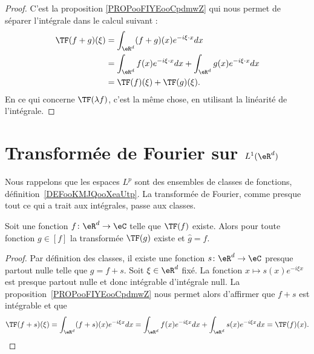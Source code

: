 \begin{proof}
	C'est la proposition \ref{PROPooFIYEooCpdmwZ} qui nous permet de séparer l'intégrale dans le calcul suivant :
	\begin{subequations}
		\begin{align}
			\TF(f+g)(\xi) & =\int_{\eR^d}(f+g)(x) e^{-i\xi\cdot x}dx                                 \\
			              & =\int_{\eR^d}f(x) e^{-i\xi\cdot x}dx+\int_{\eR^d}g(x) e^{-i\xi\cdot x}dx \\
			              & =\TF(f)(\xi)+\TF(g)(\xi).
		\end{align}
	\end{subequations}
	En ce qui concerne \( \TF(\lambda f)\), c'est la même chose, en utilisant la linéarité de l'intégrale.
\end{proof}

\section{Transformée de Fourier sur \( L^1(\eR^d)\)}

Nous rappelons que les espaces \( L^p\) sont des ensembles de classes de fonctions, définition~\ref{DEFooKMJQooXeaUtp}. La transformée de Fourier, comme presque tout ce qui a trait aux intégrales, passe aux classes.

\begin{lemma}
	Soit une fonction \( f\colon \eR^d\to \eC\) telle que \( \TF(f)\) existe. Alors pour toute fonction \( g\in[f]\) la transformée \( \TF(g)\) existe et \( \hat g=\hat f\).
\end{lemma}

\begin{proof}
	Par définition des classes, il existe une fonction \( s\colon \eR^d\to \eC\) presque partout nulle telle que \( g=f+s\). Soit \( \xi\in \eR^d\) fixé. La fonction \( x\mapsto s(x) e^{-i\xi x}\) est presque partout nulle et donc intégrable d'intégrale null. La proposition~\ref{PROPooFIYEooCpdmwZ} nous permet alors d'affirmer que \( f+s\) est intégrable et que
	\begin{equation}
		\TF(f+s)(\xi)=\int_{\eR^d}(f+s)(x) e^{-i\xi x}dx=\int_{\eR^d}f(x) e^{-i\xi x}dx+\int_{\eR^d}s(x) e^{-i\xi x}dx=\TF(f)(x).
	\end{equation}
\end{proof}

